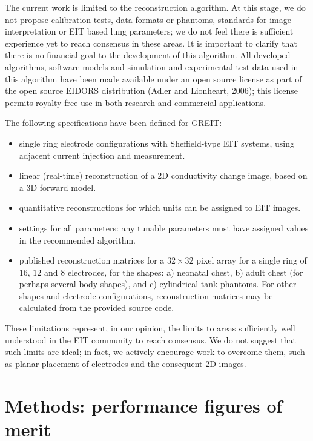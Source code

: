 \documentclass[12pt]{iopart}
\begin{document}
The current work is limited to the reconstruction algorithm.
At this stage, we do not propose calibration tests, data
 formats or phantoms, standards
for image interpretation or EIT based lung parameters; 
we do not feel there is sufficient experience yet to reach
consensus in these areas.
It is important to clarify that there is no financial
goal to the development of this algorithm.
All developed algorithms, software
models and simulation and experimental test data used
in this algorithm have been
made available under an open source license as part of
the open source EIDORS distribution (Adler and Lionheart, 2006);
this license permits
royalty free use in both research and commercial applications.


The following specifications have been defined for GREIT:
\begin{itemize}
\item
 single ring electrode
configurations with Sheffield-type EIT systems, using
      adjacent current injection and measurement.
\item
 linear (real-time) reconstruction of a 2D conductivity
change image, based on a 3D forward model.
\item
 quantitative reconstructions for which units can
  be assigned to EIT images.
\item
 settings for all parameters:
     any tunable parameters must have assigned
     values in the recommended algorithm.
\item
 published reconstruction matrices for
      a $32\times 32$ pixel array
      for a single ring of $16$, $12$ and $8$ 
      electrodes, for the shapes:
   a) neonatal chest, 
   b) adult chest (for perhaps several body shapes), and 
   c) cylindrical tank phantoms.
 For other shapes and electrode configurations,
   reconstruction matrices may be calculated from the
   provided source code.
\end{itemize}

These limitations represent, in our opinion, the limits
to areas sufficiently well understood in the EIT community
to reach consensus. We do not suggest that such limits are ideal;
in fact, we actively encourage work to overcome them,
such as planar placement of electrodes and the consequent 2D images. 

\section{Methods: performance figures of merit}
\label{sec:figmerit}
\end{document}
